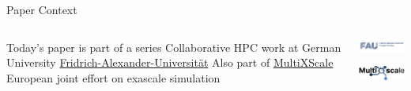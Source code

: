 \begin{frame}{Paper Context}
  \begin{columns}
  \begin{outline}
    \1 Today's paper is part of a series
    \1 Collaborative HPC work at German University
    \2 \href{https://www.fau.eu}{Fridrich-Alexander-Universit{\"a}t}
    \1 Also part of \href{https://www.multixscale.eu}{MultiXScale}
    \2 European joint effort on exascale simulation
  \end{outline}

  \centering

  \begin{center}
    \includegraphics[width=4cm]{fau_logo.png}

    \vspace{1cm}

    \includegraphics[width=4cm]{multixscale_logo.png}
  \end{center}
\end{columns}
\end{frame}
